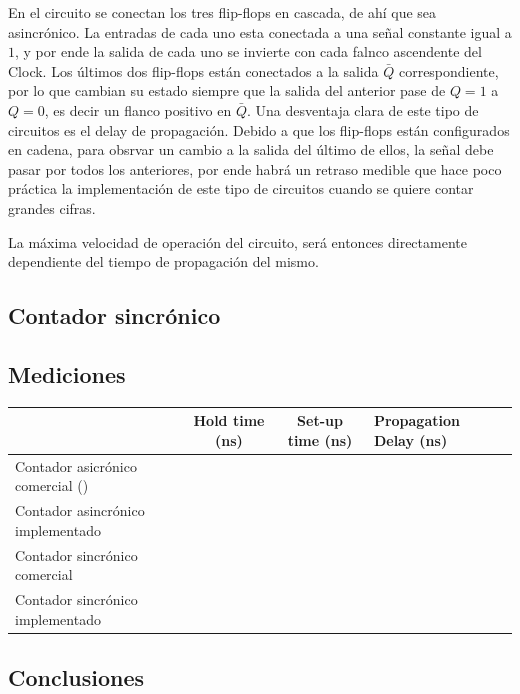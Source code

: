 En el circuito se conectan los tres flip-flops en cascada, de ahí que sea asincrónico. La entradas de cada uno esta conectada a una señal constante igual a $1$, y por ende la salida de cada uno se invierte con cada falnco ascendente del Clock. Los últimos dos flip-flops están conectados a la salida $\bar{Q}$ correspondiente, por lo que cambian su estado siempre que la salida del anterior pase de $Q = 1$ a $Q = 0$, es decir un flanco positivo en $\bar{Q}$. Una desventaja clara de este tipo de circuitos es el delay de propagación. Debido a que los flip-flops están configurados en cadena, para obsrvar un cambio a la salida del último de ellos, la señal debe pasar por todos los anteriores, por ende habrá un retraso medible que hace poco práctica la implementación de este tipo de circuitos cuando se quiere contar grandes cifras. 


La máxima velocidad de operación del circuito, será entonces directamente dependiente del tiempo de propagación del mismo. 


\subsection{Contador sincrónico}


\subsection{Mediciones}

\begin{table}[H]
\begin{tabular}{llll}\hline
\multicolumn{1}{c}{}           & \multicolumn{1}{c}{Hold time (ns)} & \multicolumn{1}{c}{Set-up time (ns)} & Propagation Delay (ns) \\
\hline
Contador asicr\'onico comercial ()    &                                &                                   &                  \\
Contador asincr\'onico implementado        &                                    &                                      &                        \\
Contador sincr\'onico comercial &                             &                          &                 \\
Contador sincr\'onico implementado   &                                    &                                      &                        \\  \hline
\end{tabular}
\end{table}

\subsection{Conclusiones}

